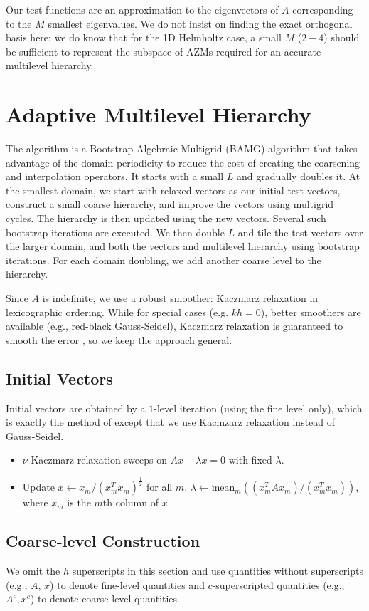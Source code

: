 \documentclass{article}
\begin{document}
Our test functions are an approximation to the eigenvectors of $A$ corresponding to the $M$ smallest eigenvalues. We do not insist on finding the exact orthogonal basis here; we do know that for the 1D Helmholtz case, a small $M$ ($2-4$) should be sufficient to represent the subspace of AZMs required for an accurate multilevel hierarchy.

\section{Adaptive Multilevel Hierarchy}
The algorithm is a Bootstrap Algebraic Multigrid (BAMG) \cite{bamg} algorithm that takes advantage of the domain periodicity to reduce the cost of creating the coarsening and interpolation operators. It starts with a small $L$ and gradually doubles it. At the smallest domain, we start with relaxed vectors as our initial test vectors, construct a small coarse hierarchy, and improve the vectors using multigrid cycles. The hierarchy is then updated using the new vectors. Several such bootstrap iterations are executed. We then double $L$ and tile the test vectors over the larger domain, and both the vectors and multilevel hierarchy using bootstrap iterations. For each domain doubling, we add another coarse level to the hierarchy.

Since $A$ is indefinite, we use a robust smoother: Kaczmarz relaxation in lexicographic ordering. While for special cases (e.g. $k h = 0$), better smoothers are available (e.g., red-black Gauss-Seidel), Kaczmarz relaxation is guaranteed to smooth the error \cite{amg_theory}, so we keep the approach general.

\subsection{Initial Vectors}
Initial vectors are obtained by a $1$-level iteration (using the fine level only), which is exactly the method of \cite{mg_eigen} except that we use Kacmzarz relaxation instead of Gauss-Seidel.
\begin{itemize}
	\item $\nu$ Kaczmarz relaxation sweeps on $A x - \lambda x = 0$ with fixed $\lambda$.
	\item Update $x \longleftarrow x_m / (x_m^T x_m)^{\frac12}$ for all $m$, $\lambda \longleftarrow \text{mean}_m ((x_m^T A x_m)/(x_m^T x_m))$, where $x_m$ is the $m$th column of $x$.
\end{itemize}

\subsection{Coarse-level Construction}
We omit the $h$ superscripts in this section and use quantities without superscripts (e.g., $A$, $x$) to denote fine-level quantities and $c$-superscripted quantities (e.g., $A^c, x^c$) to denote coarse-level quantities.
\end{document}
